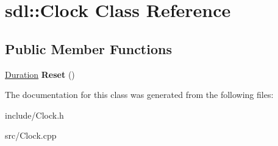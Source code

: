 \hypertarget{classsdl_1_1Clock}{\section{sdl\-:\-:Clock Class Reference}
\label{classsdl_1_1Clock}
}
\subsection*{Public Member Functions}
\begin{DoxyCompactItemize}
\item 
\hypertarget{classsdl_1_1Clock_ade50e518384d66049b89a1dd62782a16}{\hyperlink{classsdl_1_1Duration}{Duration} {\bfseries Reset} ()}\label{classsdl_1_1Clock_ade50e518384d66049b89a1dd62782a16}

\end{DoxyCompactItemize}


The documentation for this class was generated from the following files\-:\begin{DoxyCompactItemize}
\item 
include/Clock.\-h\item 
src/Clock.\-cpp\end{DoxyCompactItemize}
